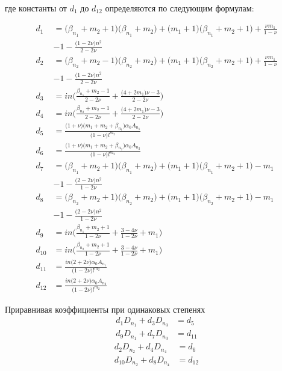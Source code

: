 где константы от \(d_1\) до \(d_{12}\) определяются по следующим формулам:

\begin{equation*}
\begin{split}
	d_1 &= \big (\beta_{n_1}+m_2+1 \big ) \big (\beta_{n_1}+m_2\big )+ \big (m_1+1 \big ) \big (\beta_{n_1}+m_2+1 \big )+ \frac{\nu m_1}{1-\nu}\\
	& - 1 - \frac{\big (1-2\nu \big )n^2}{2-2\nu}\\
	d_2 & = \big (\beta_{n_2}+m_2-1 \big ) \big (\beta_{n_2}+m_2\big )+ \big (m_1+1 \big ) \big (\beta_{n_2}+m_2+1 \big )+ \frac{\nu m_1}{1-\nu}\\
	& - 1 - \frac{\big (1-2\nu \big )n^2}{2-2\nu}\\
	d_3 &= in \big ( \frac{\beta_{n_1}+m_2-1}{2-2\nu} + \frac{\big (4+2m_1 \big )\nu -3}{2-2\nu}  \big) \\
	d_4 &= in \big ( \frac{\beta_{n_2}+m_2-1}{2-2\nu} + \frac{\big (4+2m_1 \big )\nu -3}{2-2\nu}  \big) \\
	d_5 & = \frac{\big (1+\nu \big )\big (m_1+m_2+\beta_{n_1} \big ) \alpha_0 A_{n_1}}{\big ( 1-\nu \big )l^{m_2}} \\
	d_6 & = \frac{\big (1+\nu \big )\big (m_1+m_2+\beta_{n_2} \big ) \alpha_0 A_{n_2}}{\big ( 1-\nu \big )l^{m_2}} \\
	d_7 & =  \big (\beta_{n_1}+m_2+1 \big ) \big (\beta_{n_1}+m_2\big )+ \big (m_1+1 \big ) \big (\beta_{n_1}+m_2+1 \big ) -m_1 \\
		& - 1 - \frac{\big (2-2\nu \big )n^2}{1-2\nu}\\
	d_8 & =  \big (\beta_{n_2}+m_2+1 \big ) \big (\beta_{n_2}+m_2\big )+ \big (m_1+1 \big ) \big (\beta_{n_2}+m_2+1 \big ) -m_1 \\
		& - 1 - \frac{\big (2-2\nu \big )n^2}{1-2\nu}\\
	d_9 &= in \big ( \frac{\beta_{n_1}+m_2+1}{1-2\nu} + \frac{3-4 \nu}{1-2\nu} +m_1  \big) \\
	d_{10} &= in \big ( \frac{\beta_{n_2}+m_2+1}{1-2\nu} + \frac{3-4 \nu}{1-2\nu} +m_1  \big) \\
	d_{11} &= \frac{in \big(2+2\nu \big ) \alpha_0 A_{n_1}}{\big ( 1-2\nu \big ) l^{m_2}}\\
	d_{12} &= \frac{in \big(2+2\nu \big ) \alpha_0 A_{n_2}}{\big ( 1-2\nu \big ) l^{m_2}}
\end{split}
\end{equation*}

Приравнивая коэффициенты при одинаковых степенях
\begin{equation}
\label{eq:ch2:equation36}
\begin{split}
	d_1 D_{n_1} +d_3 D_{n_3} &= d_5\\
	d_{9} D_{n_1} +d_7 D_{n_3} &= d_{11}
\end{split}
\end{equation}
\begin{equation}
\label{eq:ch2:equation37}
\begin{split}
	d_2 D_{n_2} +d_4 D_{n_4} &= d_6\\
	d_{10} D_{n_2} +d_8 D_{n_4} &= d_{12}
\end{split}
\end{equation}

